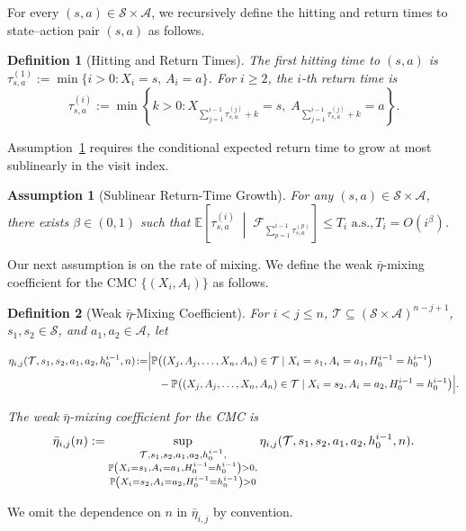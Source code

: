 \documentclass{article}
\numberwithin{equation}{section}
\newcommand{\lp}{\left(}
\newcommand{\rp}{\right)}
\newcommand{\History}{H}
\newcommand{\history}{h}
\newcommand{\Pbb}{\mathbb{P}}
\newcommand{\Tcal}{\mathcal{T}}
\newcommand{\prob}{\Pbb}
\newcommand{\pow}[1]{^{(#1)}}
\newtheorem{definition}{Definition}
\newtheorem{assumption}{Assumption}
\begin{document}
For every $(s,a)\in\mathcal{S}\times\mathcal{A}$, we recursively define the hitting and return times to state--action pair $(s,a)$ as follows.
\begin{definition}[Hitting and Return Times]
\label{def:return-times}
The first hitting time to $(s,a)$ is $\tau_{s,a}\pow{1} := \min\{i>0: X_i=s,\,A_i=a\}$. For $i\ge 2$, the $i$-th return time is
\[
\tau_{s,a}\pow{i} := \min\!\left\{k>0: X_{\sum_{j=1}^{i-1}\tau_{s,a}\pow{j}+k}=s,\;A_{\sum_{j=1}^{i-1}\tau_{s,a}\pow{j}+k}=a\right\}.
\]
\end{definition}
Assumption~\ref{ass:return-time-growth} requires the conditional expected return time to grow at most sublinearly in the visit index.
\begin{assumption}[Sublinear Return-Time Growth]
\label{ass:return-time-growth}
For any $(s,a)\in\mathcal{S}\times\mathcal{A}$, there exists $\beta\in(0,1)$ such that $\mathbb{E}\!\left[\tau_{s,a}\pow{i}\;\middle|\;\mathcal{F}_{\sum_{p=1}^{i-1}\tau_{s,a}\pow{p}}\right] \le T_i \, \, \text{a.s.}, T_i = O(i^\beta)$.
\end{assumption}
Our next assumption is on the rate of mixing.
We define the weak $\bar\eta$-mixing coefficient for the CMC $\{(X_i,A_i)\}$ as follows.
\begin{definition}[Weak $\bar\eta$-Mixing Coefficient]
\label{def:eta-mix}
For $i<j\le n$, $\mathcal{T}\subseteq(\mathcal{S}\times\mathcal{A})^{n-j+1}$, $s_1,s_2\in\mathcal{S}$, and $a_1,a_2\in\mathcal{A}$, let
\begin{small}
    \begin{align*}
        \eta_{i,j}(\mathcal{T},s_1,s_2,a_1,a_2,h_0^{i-1},n)
        \!:=\! \, &\Bigl|\mathbb{P}\bigl((X_j,A_j,\ldots,X_n,A_n)\in\mathcal{T}\mid X_i=s_1,A_i=a_1,H_0^{i-1}=h_0^{i-1}\bigr) \\
        &\quad -\mathbb{P}\bigl((X_j,A_j,\ldots,X_n,A_n)\in\mathcal{T} \mid X_i=s_2,A_i=a_2,H_0^{i-1}=h_0^{i-1}\bigr)\Bigr|.
    \end{align*}
\end{small}

The weak $\bar\eta$-mixing coefficient for the CMC is
\[
\Bar{\eta}_{i,j}(n)
:=
\sup_{\substack{\Tcal,s_1,s_2,a_1,a_2,\history_0^{i-1},\\
\prob\lp X_i=s_1,A_i=a_1,\History_0^{i-1}=\history_0^{i-1}\rp>0,\\
\prob\lp X_i=s_2,A_i=a_2,\History_0^{i-1}=\history_0^{i-1}\rp>0}}
\eta_{i,j}(\Tcal,s_1,s_2,a_1,a_2,\history_0^{i-1}, n).
\]
\end{definition}
We omit the dependence on $n$ in $\bar\eta_{i,j}$ by convention.
\end{document}
